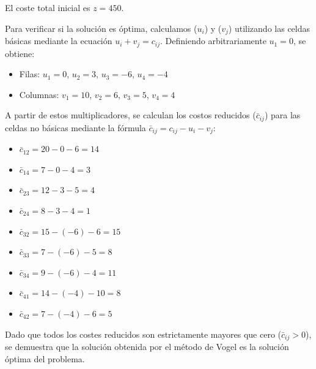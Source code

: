 El coste total inicial es $z=450$.


Para verificar si la solución es óptima, calculamos  ($u_i$) y  ($v_j$) utilizando las celdas básicas mediante la ecuación $u_i + v_j = c_{ij}$. Definiendo arbitrariamente $u_1 = 0$, se obtiene:

\begin{itemize}
    \item Filas: $u_1 = 0$, $u_2 = 3$, $u_3 = -6$, $u_4 = -4$
    \item Columnas: $v_1 = 10$, $v_2 = 6$, $v_3 = 5$, $v_4 = 4$
\end{itemize}

A partir de estos multiplicadores, se calculan los costos reducidos ($\bar{c}_{ij}$) para las celdas no básicas mediante la fórmula $\bar{c}_{ij} = c_{ij} - u_i - v_j$:

\begin{itemize}
    \item $\bar{c}_{12} = 20 - 0 - 6= 14$
    \item $\bar{c}_{14} = 7 - 0 - 4 = 3$
    \item $\bar{c}_{23} = 12 - 3 - 5 = 4$
    \item $\bar{c}_{24} = 8 - 3 - 4 = 1$
    \item $\bar{c}_{32} = 15 - (-6) - 6 = 15$
    \item $\bar{c}_{33} = 7 - (-6) - 5 = 8$
    \item $\bar{c}_{34} = 9 - (-6) -  4 = 11$
    \item $\bar{c}_{41} = 14 - (-4) - 10 = 8$
    \item $\bar{c}_{42} = 7 - (-4) -  6 = 5$
\end{itemize}

Dado que todos los costes reducidos son estrictamente mayores que cero ($\bar{c}_{ij} > 0$), se demuestra que la solución obtenida por el método de Vogel es la solución óptima del problema. 